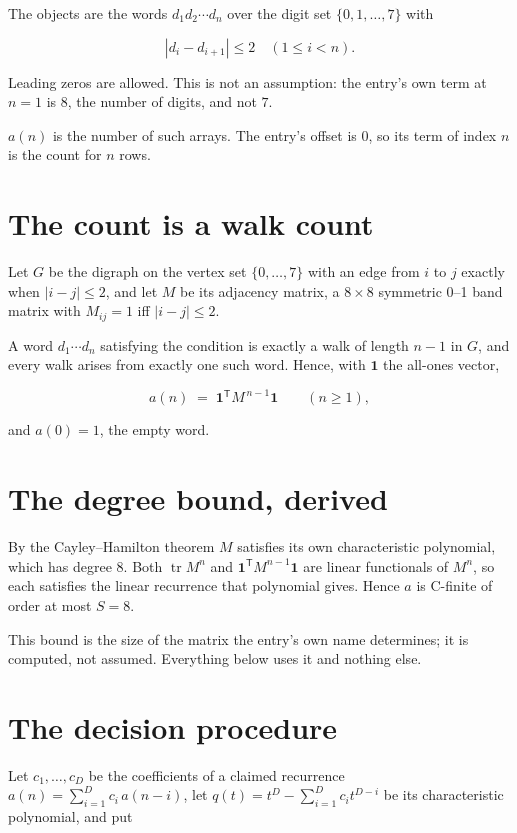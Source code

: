 \documentclass[11pt]{article}
\theoremstyle{definition}
\begin{document}
The objects are the words $d_1 d_2 \cdots d_n$ over the digit set $\{0,1,\dots,7\}$ with

\[|d_i - d_{i+1}| \le 2\quad (1 \le i < n).\]

Leading zeros are allowed. This is not an assumption: the entry's own term at $n=1$ is $8$, the number of digits, and not $7$.

$a(n)$ is the number of such arrays. The entry's offset is 0, so its term of index $n$ is the count for $n$ rows.

\section{The count is a walk count}

Let $G$ be the digraph on the vertex set $\{0,\dots,7\}$ with an edge from $i$ to $j$ exactly when $|i-j| \le 2$, and let $M$ be its adjacency matrix, a $8 \times 8$ symmetric 0--1 band matrix with $M_{ij} = 1$ iff $|i-j| \le 2$.

A word $d_1\cdots d_n$ satisfying the condition is exactly a walk of length $n-1$ in $G$, and every walk arises from exactly one such word. Hence, with $\mathbf 1$ the all-ones vector,

\[a(n) \;=\; \mathbf 1^{\mathsf T} M^{\,n-1} \mathbf 1 \qquad (n \ge 1),\]

and $a(0) = 1$, the empty word.

\section{The degree bound, derived}

By the Cayley--Hamilton theorem $M$ satisfies its own characteristic polynomial, which has degree $8$. Both $\operatorname{tr} M^n$ and $\mathbf 1^{\mathsf T} M^{n-1} \mathbf 1$ are linear functionals of $M^{n}$, so each satisfies the linear recurrence that polynomial gives. Hence $a$ is C-finite of order at most $S = 8$.

This bound is the size of the matrix the entry's own name determines; it is computed, not assumed. Everything below uses it and nothing else.

\section{The decision procedure}

Let $c_1,\dots,c_D$ be the coefficients of a claimed recurrence $a(n) = \sum_{i=1}^{D} c_i\,a(n-i)$, let $q(t) = t^{D} - \sum_{i=1}^{D} c_i t^{D-i}$ be its characteristic polynomial, and put
\end{document}
